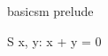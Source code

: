 \documentclass{article}
\begin{document}
\begin{zsection}
\SECTION basicsm \parents prelude
\end{zsection}

\begin{schema}{S}
     x, y: \nat
\where
    x + y = 0
\end{schema}
\end{document}
